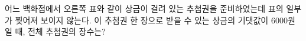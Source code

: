 \noindent\begin{minipage}[t]{0.58\linewidth}\vspace{0pt}\raggedright 어느 백화점에서 오른쪽 표와 같이 상금이 걸려 있는 추첨권을 준비하였는데 표의 일부가 찢어져 보이지 않는다. 이 추첨권 한 장으로 받을 수 있는 상금의 기댓값이 $6000$원일 때, 전체 추첨권의 장수는?\end{minipage}\hfill\begin{minipage}[t]{0.4\linewidth}\vspace{0pt}\centering \resizebox{\ifdim\width>\linewidth\linewidth\else\width\fi}{!}{}\end{minipage}\par
{}
